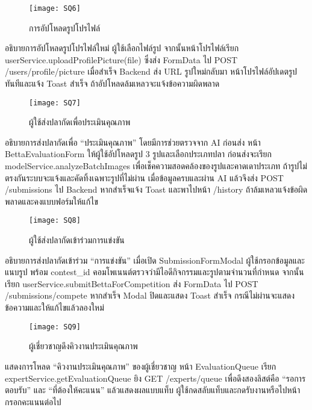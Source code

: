 \newpage

\begin{figure}[h]
	\centering
	\texttt{[image: SQ6]}
	\caption{การอัปโหลดรูปโปรไฟล์}
\end{figure}

\indent อธิบายการอัปโหลดรูปโปรไฟล์ใหม่ ผู้ใช้เลือกไฟล์รูป จากนั้นหน้าโปรไฟล์เรียก userService.uploadProfilePicture(file) ซึ่งส่ง FormData ไป POST /users/profile/picture เมื่อสำเร็จ Backend ส่ง URL รูปใหม่กลับมา หน้าโปรไฟล์อัปเดตรูปทันทีและแจ้ง Toast สำเร็จ ถ้าอัปโหลดล้มเหลวจะแจ้งข้อความผิดพลาด

\vspace{\baselineskip}

\begin{figure}[h]
	\centering
	\texttt{[image: SQ7]}
	\caption{ผู้ใช้ส่งปลากัดเพื่อประเมินคุณภาพ}
\end{figure}

\indent อธิบายการส่งปลากัดเพื่อ “ประเมินคุณภาพ” โดยมีการช่วยตรวจจาก AI ก่อนส่ง หน้า BettaEvaluationForm ให้ผู้ใช้อัปโหลดรูป 3 รูปและเลือกประเภทปลา ก่อนส่งจะเรียก modelService.analyzeBatchImages เพื่อเช็คความสอดคล้องของรูปและคาดเดาประเภท ถ้ารูปไม่ตรงกันระบบจะแจ้งและคัดทิ้งเฉพาะรูปที่ไม่ผ่าน เมื่อข้อมูลครบและผ่าน AI แล้วจึงส่ง POST /submissions ไป Backend หากสำเร็จแจ้ง Toast และพาไปหน้า /history ถ้าล้มเหลวแจ้งข้อผิดพลาดและคงแบบฟอร์มให้แก้ไข

\newpage

\begin{figure}[h]
	\centering
	\texttt{[image: SQ8]}
	\caption{ผู้ใช้ส่งปลากัดเข้าร่วมการแข่งขัน}
\end{figure}

\indent อธิบายการส่งปลากัดเข้าร่วม “การแข่งขัน” เมื่อเปิด SubmissionFormModal ผู้ใช้กรอกข้อมูลและแนบรูป พร้อม contest\_id คอมโพเนนต์ตรวจว่ามีไอดีกิจกรรมและรูปตามจำนวนที่กำหนด จากนั้นเรียก userService.submitBettaForCompetition ส่ง FormData ไป POST /submissions/compete หากสำเร็จ Modal ปิดและแสดง Toast สำเร็จ กรณีไม่ผ่านจะแสดงข้อความและให้แก้ไขแล้วลองใหม่

\vspace{\baselineskip}

\begin{figure}[h]
	\centering
	\texttt{[image: SQ9]}
	\caption{ผู้เชี่ยวชาญดึงคิวงานประเมินคุณภาพ}
\end{figure}

\indent แสดงการโหลด “คิวงานประเมินคุณภาพ” ของผู้เชี่ยวชาญ หน้า EvaluationQueue เรียก expertService.getEvaluationQueue ยิง GET /experts/queue เพื่อดึงสองลิสต์คือ “รอการตอบรับ” และ “ที่ต้องให้คะแนน” แล้วแสดงผลแบบแท็บ ผู้ใช้กดสลับแท็บและกดรับงานหรือไปหน้ากรอกคะแนนต่อไป

